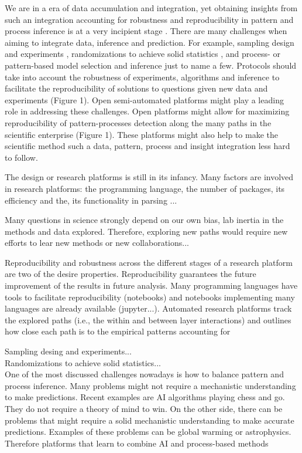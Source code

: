\documentclass[english,12pt]{article}
\begin{document}
We are in a era of data accumulation and integration, yet obtaining
insights from such an integration accounting for robustness and
reproducibility in pattern and process inference is at a very
incipient stage \citep{Ioannidis2005}. There are many challenges when
aiming to integrate data, inference and prediction. For example,
sampling design and experiments 
\citep{Voelkl2018}, randomizations to achieve solid statistics
, and process- or pattern-based model
selection and inference  just to name a
few. Protocols should take into account the robustness of experiments,
algorithms and inference to facilitate the reproducibility of
solutions to questions given new data and experiments (Figure 1). Open
semi-automated platforms  might play a
leading role in addressing these challenges. Open platforms might
allow for maximizing reproducibility of pattern-processes detection
along the many paths in the scientific enterprise (Figure 1). These
platforms might also help to make the scientific method such a data,
pattern, process and insight integration less hard to follow.

The design or research platforms is still in its infancy. Many factors
are involved in research platforms: the programming language, the
number of packages, its efficiency and the, its functionality in parsing ...


Many questions in science strongly depend on our own bias, lab inertia
in the methods and data explored. Therefore, exploring new paths would
require new efforts to lear new methods or new collaborations...

Reproducibility and robustness across the different stages of a
research platform are two of the desire properties. Reproducibility
guarantees the future improvement of the results in future
analysis. Many programming languages have tools to facilitate
reproducibility (notebooks) and notebooks implementing many languages
are already available (jupyter...). Automated research platforms track
the explored paths (i.e., the within and between layer interactions)
and outlines how close each path is to the empirical patterns
accounting for

Sampling desing and experiments...\\

Randomizations to achieve solid statistics...\\

One of the most discussed challenges nowadays is how to balance
pattern and process inference. Many problems might not require a
mechanistic understanding to make predictions. Recent examples are AI
algorithms playing chess and go. They do not require a theory of mind
to win. On the other side, there can be problems that might require a
solid mechanistic understanding to make accurate predictions. Examples
of these problems can be global warming or astrophysics. Therefore
platforms that learn to combine AI and process-based methods
\end{document}

